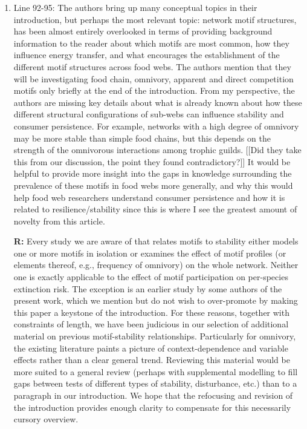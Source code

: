 \documentclass[12pt]{article}
\begin{document}
\begin{enumerate}
            
            \item Line 92-95: The authors bring up many conceptual topics in their introduction, but perhaps the most relevant topic: network motif structures, has been almost entirely overlooked in terms of providing background information to the reader about which motifs are most common, how they influence energy transfer, and what encourages the establishment of the different motif structures across food webs. The authors mention that they will be investigating food chain, omnivory, apparent and direct competition motifs only briefly at the end of the introduction. From my perspective, the authors are missing key details about what is already known about how these different structural configurations of sub-webs can influence stability and consumer persistence. For example, networks with a high degree of omnivory may be more stable than simple food chains, but this depends on the strength of the omnivorous interactions among trophic guilds. [[Did they take this from our discussion, the point they found contradictory?]] It would be helpful to provide more insight into the gaps in knowledge surrounding the prevalence of these motifs in food webs more generally, and why this would help food web researchers understand consumer persistence and how it is related to resilience/stability since this is where I see the greatest amount of novelty from this article.

                \textbf{R:} Every study we are aware of that relates motifs to stability either models one or more motifs in isolation or examines the effect of motif profiles (or elements thereof, e.g., frequency of omnivory) on the whole network. Neither one is exactly applicable to the effect of motif participation on per-species extinction risk. The exception is an earlier study by some authors of the present work, which we mention but do not wish to over-promote by making this paper a keystone of the introduction. For these reasons, together with constraints of length, we have been judicious in our selection of additional material on previous motif-stability relationships. Particularly for omnivory, the existing literature paints a picture of context-dependence and variable effects rather than a clear general trend. Reviewing this material would be more suited to a general review (perhaps with supplemental modelling to fill gaps between tests of different types of stability, disturbance, etc.) than to a paragraph in our introduction. We hope that the refocusing and revision of the introduction provides enough clarity to compensate for this necessarily cursory overview.



\end{enumerate}
\end{document}
